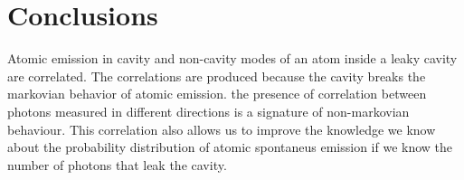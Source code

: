 \documentclass[%
 reprint,
 amsmath,amssymb,
 aps, 
]{revtex4-2}
\begin{document}
\section{Conclusions}\label{sc:conclusions}
Atomic emission in cavity and non-cavity modes of an atom inside a
leaky cavity are correlated. The correlations are produced because the
cavity breaks the markovian behavior of atomic emission. the presence
of correlation between photons measured in different directions is a
signature of non-markovian behaviour. This correlation also allows us
to improve the knowledge we know about the probability distribution of
atomic spontaneus emission if we know the number of photons that leak
the cavity. 





\end{document}
